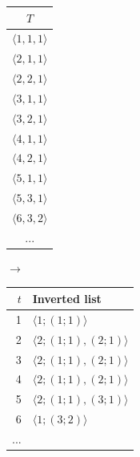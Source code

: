 \documentclass[svgnames]{beamer}
\begin{document}
\begin{frame}
\begin{columns}
\begin{block}{}
            \begin{tabular}{|c|}\hline
                $T$ \\\hline
                $\langle 1,1,1 \rangle$ \\\hline
                $\langle 2,1,1 \rangle$ \\
                $\langle 2,2,1 \rangle$ \\\hline
                $\langle 3,1,1 \rangle$ \\
                $\langle 3,2,1 \rangle$ \\\hline
                $\langle 4,1,1 \rangle$ \\
                $\langle 4,2,1 \rangle$ \\\hline
                $\langle 5,1,1 \rangle$ \\
                $\langle 5,3,1 \rangle$ \\\hline
                $\langle 6,3,2 \rangle$ \\
                ... \\\hline
            \end{tabular}      
            {\large $\rightarrow$}
            \begin{tabular}{rl}
                $t$ & Inverted list \\\hline
                1 & $\langle 1;(1;1) \rangle$ \\
                2 & $\langle 2;(1;1),(2;1) \rangle$ \\
                3 & $\langle 2;(1;1),(2;1) \rangle$ \\
                4 & $\langle 2;(1;1),(2;1) \rangle$ \\
                5 & $\langle 2;(1;1),(3;1) \rangle$ \\
                6 & $\langle 1;(3;2) \rangle$ \\
                ... & \\
            \end{tabular}
        \end{block}
    \end{columns}
\end{frame}


\newcommand{\ceil}[1]{\ensuremath{\lceil #1 \rceil}}
\newcommand{\floor}[1]{\ensuremath{\lfloor #1 \rfloor}}
\end{document}
